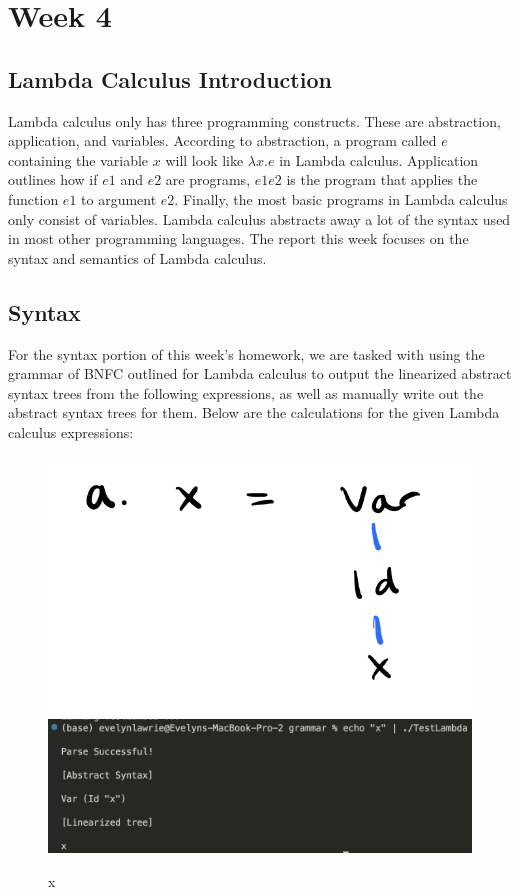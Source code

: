 \documentclass{article}
\theoremstyle{theorem}
\theoremstyle{definition}
\theoremstyle{remark}
\begin{document}
\section{Week 4}

\subsection{Lambda Calculus Introduction}

Lambda calculus only has three programming constructs. These are abstraction, application, and variables. According to abstraction, a program called $e$ containing the variable $x$ will look like $\lambda x. e$ in Lambda calculus. Application outlines how if $e1$ and $e2$ are programs, $e1 e2$  is the program that applies the function $e1$ to argument $e2$. Finally, the most basic programs in Lambda calculus only consist of variables. Lambda calculus abstracts away a lot of the syntax used in most other programming languages. The report this week focuses on the syntax and semantics of Lambda calculus.

\subsection{Syntax}

For the syntax portion of this week's homework, we are tasked with using the grammar of BNFC outlined for Lambda calculus to output the linearized abstract syntax trees from the following expressions, as well as manually write out the abstract syntax trees for them. Below are the calculations for the given Lambda calculus expressions: 

\begin{figure}[H]
\begin{center}
\includegraphics[scale=0.4]{img/aAST.png}
\\
\includegraphics[scale=0.4]{img/ASTa.png}
\end{center}
\caption{x}\label{ASTa}
\end{figure}
\end{document}
